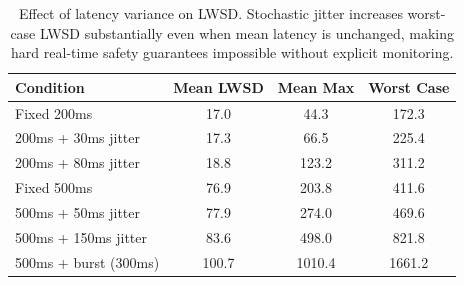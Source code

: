 \begin{table}[t]
\centering
\caption{Effect of latency variance on LWSD. Stochastic jitter increases worst-case LWSD substantially even when mean latency is unchanged, making hard real-time safety guarantees impossible without explicit monitoring.}
\label{tab:jitter}
\begin{tabular}{@{}lccc@{}}
\toprule
\textbf{Condition} & \textbf{Mean LWSD} & \textbf{Mean Max} & \textbf{Worst Case} \\
\midrule
Fixed 200ms & 17.0 & 44.3 & 172.3 \\
200ms + 30ms jitter & 17.3 & 66.5 & 225.4 \\
200ms + 80ms jitter & 18.8 & 123.2 & 311.2 \\
Fixed 500ms & 76.9 & 203.8 & 411.6 \\
500ms + 50ms jitter & 77.9 & 274.0 & 469.6 \\
500ms + 150ms jitter & 83.6 & 498.0 & 821.8 \\
500ms + burst (300ms) & 100.7 & 1010.4 & 1661.2 \\
\bottomrule
\end{tabular}
\end{table}
